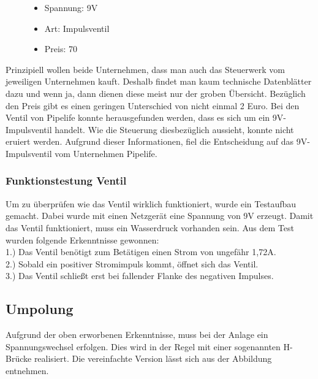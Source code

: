 \begin{figure}
\begin{minipage}[t]{0.45\textwidth}
\begin{itemize}
	\item{Spannung: 9V}
	\item{Art: Impulsventil}
	\item{Preis: 70\textsf{\texteuro}}
\end{itemize}

\end{minipage}
\end{figure} 

Prinzipiell wollen beide Unternehmen, dass man auch das Steuerwerk vom jeweiligen Unternehmen kauft. Deshalb findet man kaum technische Datenblätter dazu und wenn ja, dann dienen diese meist nur der groben Übersicht. Bezüglich den Preis gibt es einen geringen Unterschied von nicht einmal 2 Euro. Bei den Ventil von Pipelife konnte herausgefunden werden, dass es sich um ein 9V-Impulsventil handelt. Wie die Steuerung diesbezüglich aussieht, konnte nicht eruiert werden. Aufgrund dieser Informationen, fiel die Entscheidung auf das 9V-Impulsventil vom Unternehmen Pipelife.

\subsubsection{Funktionstestung Ventil}
\label{sec:funktionstestungVentil}

Um zu überprüfen wie das Ventil wirklich funktioniert, wurde ein Testaufbau gemacht. Dabei wurde mit einen Netzgerät eine Spannung von 9V erzeugt. Damit das Ventil funktioniert, muss ein Wasserdruck vorhanden sein. Aus dem Test wurden folgende Erkenntnisse gewonnen: \\

1.) Das Ventil benötigt zum Betätigen einen Strom von ungefähr 1,72A. \\

2.) Sobald ein positiver Stromimpuls kommt, öffnet sich das Ventil.\\

3.) Das Ventil schließt erst bei fallender Flanke des negativen Impulses.

\subsection{Umpolung}
\label{sec:umpolung}

Aufgrund der oben erworbenen Erkenntnisse, muss bei der Anlage ein Spannungswechsel erfolgen. Dies wird in der Regel mit einer sogenannten H-Brücke realisiert. Die vereinfachte Version lässt sich aus der Abbildung entnehmen. 

